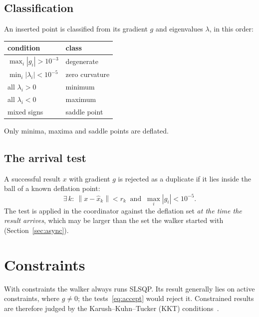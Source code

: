\documentclass[11pt]{article}
\newcommand{\norm}[1]{\left\lVert #1 \right\rVert}
\newcommand{\xh}{\hat{x}}
\begin{document}
\subsection{Classification}

An inserted point is classified from its gradient $g$ and eigenvalues $\lambda$, in this order:
\begin{center}
\begin{tabular}{ll}
\toprule
condition & class \\
\midrule
$\max_i |g_i| > 10^{-3}$ & degenerate \\
$\min_i |\lambda_i| < 10^{-5}$ & zero curvature \\
all $\lambda_i > 0$ & minimum \\
all $\lambda_i < 0$ & maximum \\
mixed signs & saddle point \\
\bottomrule
\end{tabular}
\end{center}
Only minima, maxima and saddle points are deflated.

\subsection{The arrival test}\label{sec:arrival}

A successful result $x$ with gradient $g$ is rejected as a duplicate if it lies inside the ball
of a known deflation point:
\begin{equation}\label{eq:arrival}
  \exists\, k:\ \norm{x - \xh_k} < r_k \ \text{ and }\ \max_i |g_i| < 10^{-5}.
\end{equation}
The test is applied in the coordinator against the deflation set \emph{at the time the result
arrives}, which may be larger than the set the walker started with (Section~\ref{sec:async}).

\section{Constraints}\label{sec:constraints}

With constraints the walker always runs SLSQP. Its result generally lies on active
constraints, where $g \ne 0$; the tests~\eqref{eq:accept} would reject it. Constrained results
are therefore judged by the Karush--Kuhn--Tucker (KKT) conditions~\cite{nocedal2006}.
\end{document}
